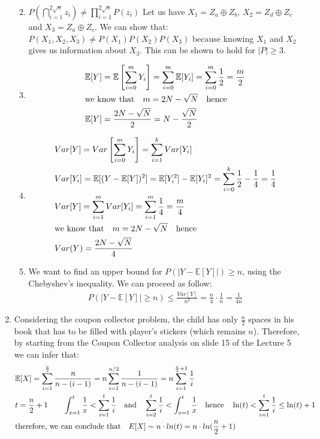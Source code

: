 \documentclass[11pt,a4paper]{article}
\begin{document}
\begin{enumerate}
\begin{enumerate}
\begin{itemize}
\end{itemize}

\item $P(\bigcap_{i=1}^{2\sqrt{n}}z_i) \neq \prod_{i=1}^{2\sqrt{n}}P(z_i)$
Let us have $X_1=Z_a \oplus Z_b$, $X_2=Z_d \oplus Z_c$ and $X_3=Z_a \oplus Z_c$. We can show
that: $P(X_1, X_2, X_3) \neq P(X_1)P(X_2)P(X_3)$ because knowing $X_1$ and $X_2$ gives us 
information about $X_3$. This can be shown to hold for $|P| \geq 3$.

\item 
\begin{align*}
&\mathbb{E}[Y] = \mathbb{E}\left[\sum_{i=0}^m Y_i \right] = \sum_{i=0}^m \mathbb{E}[Y_i] = \sum_{i=0}^m \frac{1}{2} = \frac{m}{2}\\
&\hbox{we know that} \quad m = 2N - \sqrt{N} \quad \hbox{hence}\\
&\mathbb{E}[Y] = \frac{2N - \sqrt{N}}{2} = N - \frac{\sqrt{N}}{2}
\end{align*}

\item
\begin{align*}
&Var[Y] = Var\left[\sum_{i=0}^m Y_i \right] = \sum_{i=1}^k Var[Y_i]\\
&Var[Y_i] = \mathbb{E}[(Y-\mathbb{E}[Y])^2] = \mathbb{E}[Y_i^2] - \mathbb{E}[Y_i]^2 = \sum_{i=0}^k \frac{1}{2} -\frac{1}{4}=\frac{1}{4}\\
&Var[Y]=	\sum_{i=1}^m Var[Y_i] = \sum_{i=1}^m \frac{1}{4} = \frac{m}{4}\\
&\hbox{we know that} \quad m = 2N - \sqrt{N} \quad \hbox{hence}\\
&Var(Y) = \frac{2N - \sqrt{N}}{4}
\end{align*}

\item
We want to find an upper bound for $P(|Y-\mathbb{E}[Y]|) \geq n$, using the Chebyshev's inequality. We can proceed as follow:
\begin{align*}
P(|Y-\mathbb{E}[Y]| \geq n) \leq \frac{Var[Y]}{n^2} = \frac{n}{4}\cdot\frac{1}{n} = \frac{1}{4n}
\end{align*}

\end{enumerate}

\item 
Considering the coupon collector problem, the child has only $\frac{n}{2}$ spaces in his book that has to be filled 
with player's stickers (which remains $n$). Therefore, by starting from the Coupon Collector analysis on slide 15 of the Lecture 5 we can infer that:
\begin{align*}
&\mathbb{E}[X] = \sum_{i=1}^{\frac{n}{2}} \frac{n}{n-(i-1)} = n\sum_{i=1}^{n/2} \frac{1}{n-(i-1)} = n\sum_{i=1}^{\frac{n}{2}+1} \frac{1}{i} \\
&t=\frac{n}{2}+1 \qquad \int_{x=1}^t \frac{1}{x} < \sum_{i=1}^t \frac{1}{i} \quad \hbox{and} \quad \sum_{i=2}^t \frac{1}{i} < \int_{x=1}^t \frac{1}{x} \quad \hbox{hence} \quad \ln(t) < \sum_{i=1}^t \frac{1}{i} \leq \ln(t)+1 \\
& \hbox{therefore, we can conclude that}\quad E[X] \sim n \cdot ln(t)= n \cdot ln(\frac{n}{2}+1)
\end{align*}
\end{enumerate}
\end{document}
